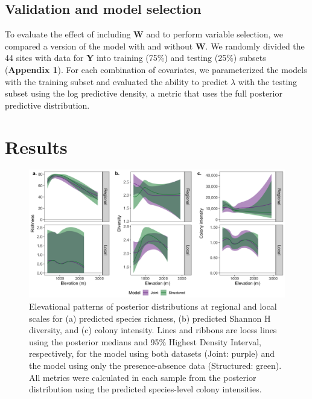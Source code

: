 \documentclass[preprint,review,times,12pt]{elsarticle}
\begin{document}
\subsection{Validation and model selection}
To evaluate the effect of including \textbf{W} and to perform variable selection, we compared a version of the model with and without \textbf{W}. We randomly divided the 44 sites with data for \textbf{Y} into training (75\%) and testing (25\%) subsets (\textbf{Appendix 1}). For each combination of covariates, we parameterized the models with the training subset and evaluated the ability to predict $\lambda$ with the testing subset using the log predictive density, a metric that uses the full posterior predictive distribution. 




\section{Results}
\label{S:3}
\begin{figure}
	\centering\includegraphics[width=6in]{figs/el_patterns.png}
	\caption{\label{fig:el_patterns} Elevational patterns of posterior distributions at regional and local scales for (a) predicted species richness, (b) predicted Shannon H diversity, and (c) colony intensity. Lines and ribbons are loess lines using the posterior medians and 95\% Highest Density Interval, respectively, for the model using both datasets (Joint: purple) and the model using only the presence-absence data (Structured: green). All metrics were calculated in each sample from the posterior distribution using the predicted species-level colony intensities. }
\end{figure}
\end{document}
